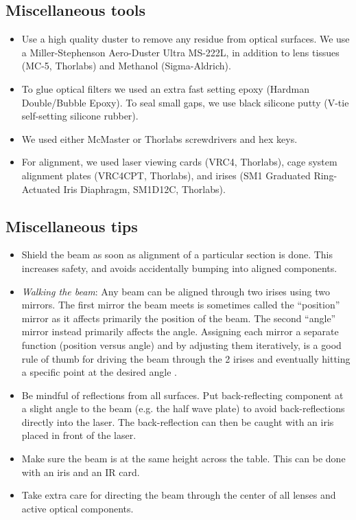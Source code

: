 \documentclass[10pt,letterpaper]{article}
\begin{document}
\subsection{Miscellaneous tools}
\begin{itemize}
    \item Use a high quality duster to remove any residue from optical surfaces. We use a Miller-Stephenson Aero-Duster Ultra MS-222L, in addition to lens tissues (MC-5, Thorlabs) and Methanol (Sigma-Aldrich).
    \item To glue optical filters we used an extra fast setting epoxy (Hardman Double/Bubble Epoxy). To seal small gaps, we use black silicone putty (V-tie self-setting silicone rubber).
    \item We used either McMaster or Thorlabs screwdrivers and hex keys.
    \item For alignment, we used laser viewing cards (VRC4, Thorlabs), cage system alignment plates (VRC4CPT, Thorlabs), and irises (SM1 Graduated Ring-Actuated Iris Diaphragm, SM1D12C, Thorlabs).
\end{itemize}

\subsection{Miscellaneous tips}
\begin{itemize}
    \item Shield the beam as soon as alignment of a particular section is done. This increases safety, and avoids accidentally bumping into aligned components.
    \item \textit{Walking the beam}: Any beam can be aligned through two irises using two mirrors. The first mirror the beam meets is sometimes called the ``position'' mirror as it affects primarily the position of the beam. The second ``angle'' mirror instead primarily affects the angle. Assigning each mirror a separate function (position versus angle) and by adjusting them iteratively, is a good rule of thumb for driving the beam through the 2 irises and eventually hitting a specific point at the desired angle \cite{Thorlabs}. 
    \item Be mindful of reflections from all surfaces. Put back-reflecting component at a slight angle to the beam (e.g. the half wave plate) to avoid back-reflections directly into the laser. The back-reflection can then be caught with an iris placed in front of the laser.
    \item Make sure the beam is at the same height across the table. This can be done with an iris and an IR card. 
    \item Take extra care for directing the beam through the center of all lenses and active optical components.
\end{itemize}
\end{document}
